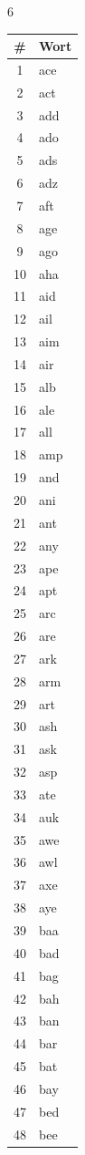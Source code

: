\documentclass[11pt,a4paper]{article}
\begin{document}
\begin{multicols}{6}
\small
\begin{tabular}{cl}
\toprule
\# & Wort \\
\midrule
1 & ace \\
2 & act \\
3 & add \\
4 & ado \\
5 & ads \\
6 & adz \\
7 & aft \\
8 & age \\
9 & ago \\
10 & aha \\
11 & aid \\
12 & ail \\
13 & aim \\
14 & air \\
15 & alb \\
16 & ale \\
17 & all \\
18 & amp \\
19 & and \\
20 & ani \\
21 & ant \\
22 & any \\
23 & ape \\
24 & apt \\
25 & arc \\
26 & are \\
27 & ark \\
28 & arm \\
29 & art \\
30 & ash \\
31 & ask \\
32 & asp \\
33 & ate \\
34 & auk \\
35 & awe \\
36 & awl \\
37 & axe \\
38 & aye \\
39 & baa \\
40 & bad \\
41 & bag \\
42 & bah \\
43 & ban \\
44 & bar \\
45 & bat \\
46 & bay \\
47 & bed \\
48 & bee \\
\bottomrule
\end{tabular}


\end{multicols}
\end{document}
